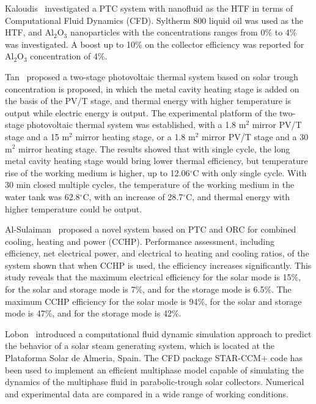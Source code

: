 Kaloudis~\cite{Kaloudis2016} investigated a PTC system with nanofluid as the HTF in terms of Computational Fluid Dynamics (CFD). Syltherm 800 liquid oil was used as the HTF, and Al$_2$O$_3$ nanoparticles with the concentrations ranges from 0\% to 4\% was investigated. A boost up to 10\% on the collector efficiency was reported for Al$_2$O$_3$ concentration of 4\%.

Tan~\cite{Tan2014} proposed a two-stage photovoltaic thermal system based on solar trough concentration is proposed, in which the metal cavity heating stage is added on the basis of the PV/T stage, and thermal energy with higher temperature is output while electric energy is output. The experimental platform of the two-stage photovoltaic thermal system was established, with a 1.8 m$^2$ mirror PV/T stage and a 15 m$^2$ mirror heating stage, or a 1.8 m$^2$ mirror PV/T stage and a 30 m$^2$ mirror heating stage. The results showed that with single cycle, the long metal cavity heating stage would bring lower thermal efficiency, but temperature rise of the working medium is higher, up to 12.06$^\circ$C with only single cycle. With 30 min closed multiple cycles, the temperature of the working medium in the water tank was 62.8$^\circ$C, with an increase of 28.7$^\circ$C, and thermal energy with higher temperature could be output.

Al-Sulaiman~\cite{AlSulaiman2012} proposed a novel system based on PTC and ORC for combined cooling, heating and power (CCHP). Performance assessment, including efficiency, net electrical power, and electrical to heating and cooling ratios, of the system shown that when CCHP is used, the efficiency increases significantly. This study reveals that the maximum electrical efficiency for the solar mode is 15\%, for the solar and storage mode is 7\%, and for the storage mode is 6.5\%. The maximum CCHP efficiency for the solar mode is 94\%, for the solar and storage mode is 47\%, and for the storage mode is 42\%.

Lobon~\cite{Lobon2014} introduced a computational fluid dynamic simulation approach to predict the behavior of a solar steam generating system, which is located at the Plataforma Solar de Almeria, Spain. The CFD package STAR-CCM+ code has been used to implement an efficient multiphase model capable of simulating the dynamics of the multiphase fluid in parabolic-trough solar collectors. Numerical and experimental data are compared in a wide range of working conditions.


